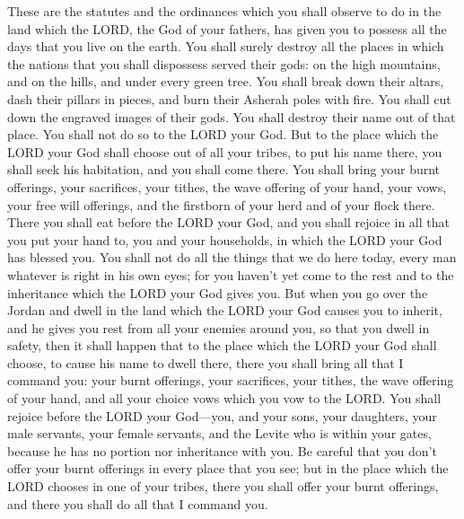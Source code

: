 \mychapter{} \myverse*{}These are the statutes and the ordinances which you shall observe
to do in the land which the LORD, the God of your fathers, has given you to possess all the days that
you live on the earth.
\myverse{}You shall surely destroy all the places in which the nations that you shall
dispossess served their gods: on the high mountains, and on the hills, and under every green tree.
\myverse{}You shall break down their altars, dash their pillars in pieces, and burn their
Asherah poles with fire. You shall cut down the engraved images of their gods. You shall destroy their
name out of that place.
\myverse{}You shall not do so to the LORD your God.
\myverse{}But to the place which the LORD your God shall choose out of all your tribes,
to put his name there, you shall seek his habitation, and you shall come there.
\myverse{}You shall bring your burnt offerings, your sacrifices, your tithes, the wave
offering of your hand, your vows, your free will offerings, and the firstborn of your herd and of your
flock there.
\myverse{}There you shall eat before the LORD your God, and you shall rejoice in all
that you put your hand to, you and your households, in which the LORD your God has blessed you.
\myverse{}You shall not do all the things that we do here today, every man whatever is
right in his own eyes;
\myverse{}for you haven’t yet come to the rest and to the inheritance which the LORD
your God gives you.
\myverse{}But when you go over the Jordan and dwell in the land which the LORD your
God causes you to inherit, and he gives you rest from all your enemies around you, so that you dwell in
safety,
\myverse{}then it shall happen that to the place which the LORD your God shall choose,
to cause his name to dwell there, there you shall bring all that I command you: your burnt offerings,
your sacrifices, your tithes, the wave offering of your hand, and all your choice vows which you vow to
the LORD.
\myverse{}You shall rejoice before the LORD your God—you, and your sons, your daughters,
your male servants, your female servants, and the Levite who is within your gates, because he has no portion
nor inheritance with you.
\myverse{}Be careful that you don’t offer your burnt offerings in every place that
you see;
\myverse{}but in the place which the LORD chooses in one of your tribes, there you
shall offer your burnt offerings, and there you shall do all that I command you.


